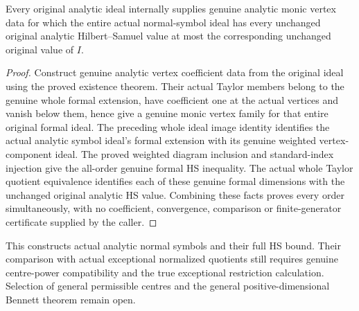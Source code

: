 \begin{theorem}
\label{hir:actual-original-analytic-normal-vertex-symbol-hs-bound}
\leanok
Every original analytic ideal internally supplies genuine analytic monic
vertex data for which the entire actual normal-symbol ideal has every
unchanged original analytic Hilbert--Samuel value at most the
corresponding unchanged original value of $I$.
\end{theorem}
\begin{proof}
Construct genuine analytic vertex coefficient data from the original
ideal using the proved existence theorem. Their actual Taylor members
belong to the genuine whole formal extension, have coefficient one at
the actual vertices and vanish below them, hence give a genuine monic
vertex family for that entire original formal ideal. The preceding
whole ideal image identity identifies the actual analytic symbol ideal's
formal extension with its genuine weighted vertex-component ideal.
The proved weighted diagram inclusion and standard-index injection give
the all-order genuine formal HS inequality. The actual whole Taylor
quotient equivalence identifies each of these genuine formal dimensions
with the unchanged original analytic HS value. Combining these facts
proves every order simultaneously, with no coefficient, convergence,
comparison or finite-generator certificate supplied by the caller.
\end{proof}

This constructs actual analytic normal symbols and their full HS bound.
Their comparison with actual exceptional normalized quotients still
requires genuine centre-power compatibility and the true exceptional
restriction calculation. Selection of general permissible centres and
the general positive-dimensional Bennett theorem remain open.
